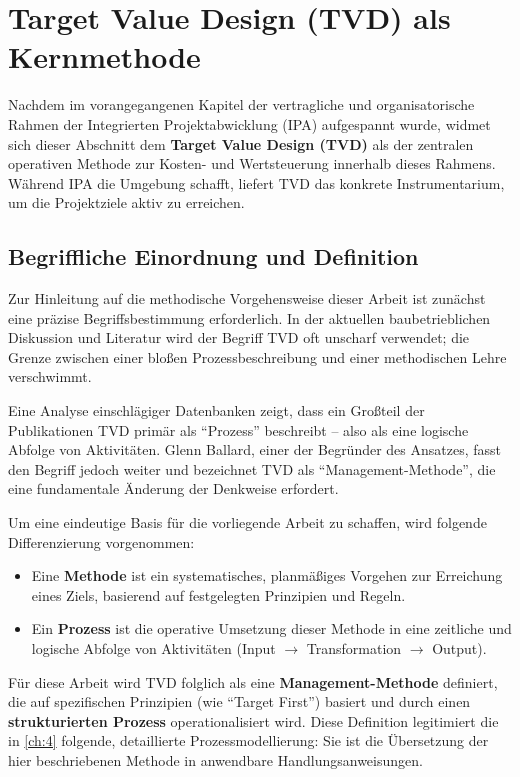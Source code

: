 \clearpage

\section{Target Value Design (TVD) als Kernmethode}
\label{sec:2.3}

Nachdem im vorangegangenen Kapitel der vertragliche und organisatorische Rahmen der Integrierten Projektabwicklung (\acs{IPA}) aufgespannt wurde, widmet sich dieser Abschnitt dem \textbf{Target Value Design (\acs{TVD})} als der zentralen operativen Methode zur Kosten- und Wertsteuerung innerhalb dieses Rahmens. Während \acs{IPA} die Umgebung schafft, liefert \acs{TVD} das konkrete Instrumentarium, um die Projektziele aktiv zu erreichen.

\subsection{Begriffliche Einordnung und Definition}
\label{sec:2.3.1}

Zur Hinleitung auf die methodische Vorgehensweise dieser Arbeit ist zunächst eine präzise Begriffsbestimmung erforderlich. In der aktuellen baubetrieblichen Diskussion und Literatur wird der Begriff \acs{TVD} oft unscharf verwendet; die Grenze zwischen einer bloßen Prozessbeschreibung und einer methodischen Lehre verschwimmt.

Eine Analyse einschlägiger Datenbanken zeigt, dass ein Großteil der Publikationen \acs{TVD} primär als \enquote{Prozess} beschreibt – also als eine logische Abfolge von Aktivitäten. Glenn Ballard, einer der Begründer des Ansatzes, fasst den Begriff jedoch weiter und bezeichnet \acs{TVD} als \enquote{Management-Methode}, die eine fundamentale Änderung der Denkweise erfordert. \autocite[Vgl.][S.~2--4]{ballard_target_2025}

Um eine eindeutige Basis für die vorliegende Arbeit zu schaffen, wird folgende Differenzierung vorgenommen:
\begin{itemize}
    \item Eine \textbf{Methode} ist ein systematisches, planmäßiges Vorgehen zur Erreichung eines Ziels, basierend auf festgelegten Prinzipien und Regeln.
    \item Ein \textbf{Prozess} ist die operative Umsetzung dieser Methode in eine zeitliche und logische Abfolge von Aktivitäten (Input $\rightarrow$ Transformation $\rightarrow$ Output).
\end{itemize}

Für diese Arbeit wird \acs{TVD} folglich als eine \textbf{Management-Methode} definiert, die auf spezifischen Prinzipien (wie \enquote{Target First}) basiert und durch einen \textbf{strukturierten Prozess} operationalisiert wird. Diese Definition legitimiert die in \cref{ch:4} folgende, detaillierte Prozessmodellierung: Sie ist die Übersetzung der hier beschriebenen Methode in anwendbare Handlungsanweisungen.

